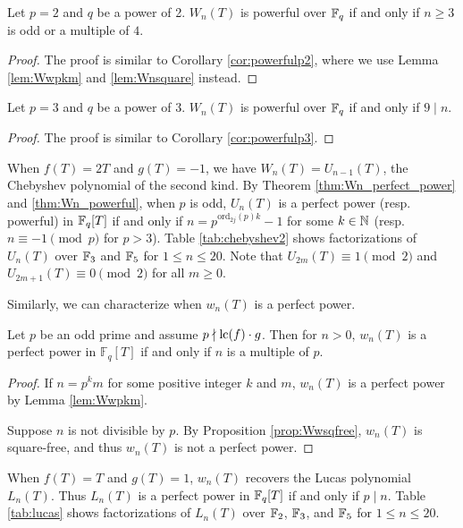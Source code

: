 \begin{theorem}
    Let $p = 2$ and $q$ be a power of 2.
    $W_n(T)$ is powerful over $\mathbb{F}_q$ if and only if $n \ge 3$ is odd or a multiple of $4$.
\end{theorem}
\begin{proof}
    The proof is similar to Corollary \ref{cor:powerfulp2}, where we use Lemma \ref{lem:Wwpkm} and \ref{lem:Wnsquare} instead.
\end{proof}

\begin{theorem}
    Let $p = 3$ and $q$ be a power of 3.
    $W_n(T)$ is powerful over $\mathbb{F}_q$ if and only if $9 \mid n$.
\end{theorem}
\begin{proof}
    The proof is similar to Corollary \ref{cor:powerfulp3}.
\end{proof}

\begin{example}
\label{ex:chebyshev2}
    When $f(T) = 2T$ and $g(T) = -1$, we have $W_n(T) = U_{n-1}(T)$, the Chebyshev polynomial of the second kind.
    By Theorem \ref{thm:Wn_perfect_power} and \ref{thm:Wn_powerful}, when $p$ is odd, $U_n(T)$ is a perfect power (resp. powerful) in $\mathbb{F}_q[T]$ if and only if $n = p^{\mathrm{ord}_{2j}(p)k} - 1$ for some $k \in \mathbb{N}$ (resp. $n \equiv -1 \pmod{p}$ for $p > 3$).
    Table \ref{tab:chebyshev2} shows factorizations of $U_n(T)$ over $\mathbb{F}_3$ and $\mathbb{F}_5$ for $1 \le n \le 20$.
    Note that $U_{2m}(T) \equiv 1 \pmod{2}$ and $U_{2m+1}(T) \equiv 0 \pmod{2}$ for all $m \ge 0$.
\end{example}


Similarly, we can characterize when $w_n(T)$ is a perfect power.
\begin{corollary}
\label{cor:wn_perfect_power}
    Let $p$ be an odd prime and assume $p \nmid \mathrm{lc} (f) \cdot g$. Then for $n > 0$, $w_n(T)$ is a perfect power in $\mathbb{F}_q[T]$ if and only if $n$ is a multiple of $p$.
\end{corollary}
\begin{proof}
    If $n = p^k m$ for some positive integer $k$ and $m$, $w_n(T)$ is a perfect power by Lemma \ref{lem:Wwpkm}.
    
    Suppose $n$ is not divisible by $p$. By Proposition \ref{prop:Wwsqfree}, $w_n(T)$ is square-free, and thus $w_n(T)$ is not a perfect power.
\end{proof}

\begin{example}
    When $f(T) = T$ and $g(T) = 1$, $w_n(T)$ recovers the Lucas polynomial $L_n(T)$.
    Thus $L_n(T)$ is a perfect power in $\mathbb{F}_q[T]$ if and only if $p \mid n$.
    Table \ref{tab:lucas} shows factorizations of $L_n(T)$ over $\mathbb{F}_2$, $\mathbb{F}_3$, and $\mathbb{F}_5$ for $1 \le n \le 20$.
\end{example}


